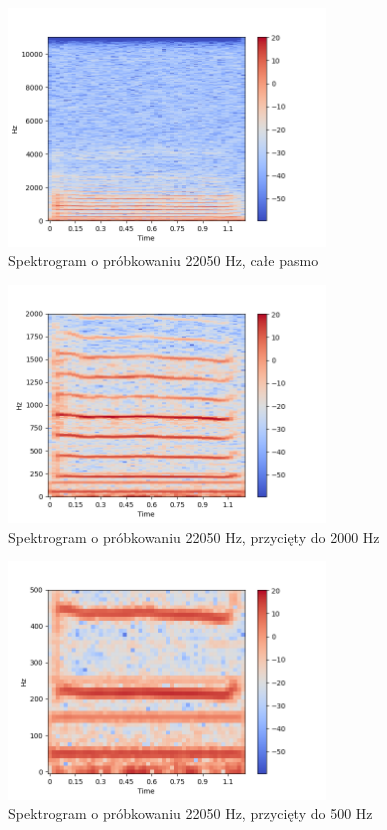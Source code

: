 \documentclass[a4paper,12pt]{extarticle}
\begin{document}
\clearpage

\begin{figure}[h!]
\centering
\includegraphics[width=0.75\textwidth]{spec-ylim-11025}
\caption{Spektrogram o próbkowaniu 22050 Hz, całe pasmo}
\end{figure}

\begin{figure}[h!]
\centering
\includegraphics[width=0.75\textwidth]{spec-ylim-2000}
\caption{Spektrogram o próbkowaniu 22050 Hz, przycięty do 2000 Hz}
\end{figure}

\clearpage

\begin{figure}[h!]
\centering
\includegraphics[width=0.75\textwidth]{spec-ylim-500}
\caption{Spektrogram o próbkowaniu 22050 Hz, przycięty do 500 Hz}
\end{figure}
\end{document}
